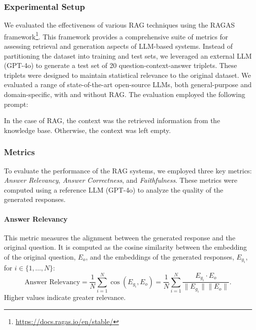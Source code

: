 \subsubsection{Experimental Setup}
We evaluated the effectiveness of various \gls{RAG} techniques using the RAGAS framework\footnote{\url{https://docs.ragas.io/en/stable/}}.
%
This framework provides a comprehensive suite of metrics for assessing retrieval and generation aspects of \gls{LLM}-based systems.
%
Instead of partitioning the dataset into training and test sets, we leveraged an external \gls{LLM} (GPT-4o) to generate a test set of 20 question-context-answer triplets.
%
These triplets were designed to maintain statistical relevance to the original dataset.
%
We evaluated a range of state-of-the-art open-source \glspl{LLM}, both general-purpose and domain-specific, with and without \gls{RAG}.
%
The evaluation employed the following prompt:
%
\begin{center}
\end{center}
%
In the case of \gls{RAG}, the context was the retrieved information from the knowledge base.
%
Otherwise, the context was left empty.


\subsubsection{Metrics}
To evaluate the performance of the \gls{RAG} systems, we employed three key metrics: \textit{Answer Relevancy}, \textit{Answer Correctness}, and \textit{Faithfulness}.
%
These metrics were computed using a reference \gls{LLM} (GPT-4o) to analyze the quality of the generated responses.

\paragraph{Answer Relevancy}
This metric measures the alignment between the generated response and the original question.
%
It is computed as the cosine similarity between the embedding of the original question, \(E_o\), and the embeddings of the generated responses, \(E_{g_i}\), for \(i \in \{1, \dots, N\}\):
%
\begin{equation}
    \label{eq:answer-relevancy}
    \text{Answer Relevancy} = \frac{1}{N} \sum_{i=1}^{N} \cos(E_{g_i}, E_o) = \frac{1}{N} \sum_{i=1}^{N} \frac{E_{g_i} \cdot E_o}{\|E_{g_i}\| \|E_o\|}.
\end{equation}
%
Higher values indicate greater relevance.

